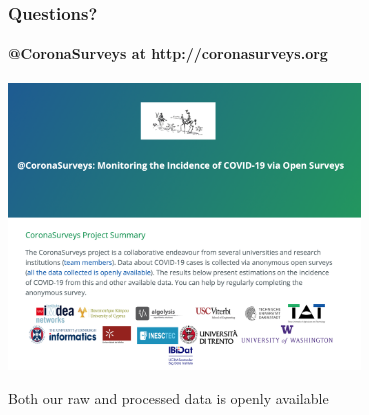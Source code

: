 \documentclass{beamer}
\begin{document}







\begin{frame}
  \frametitle{Questions?}
  \framesubtitle{@CoronaSurveys at http://coronasurveys.org}
  \begin{center}
  \includegraphics[width=0.7\textwidth]{CoronaSurveys.png}
  \end{center}
  Both our raw and processed data is openly available
\end{frame}
\end{document}
